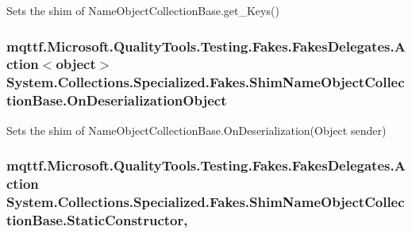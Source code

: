 Sets the shim of Name\-Object\-Collection\-Base.\-get\-\_\-\-Keys()

\hypertarget{class_system_1_1_collections_1_1_specialized_1_1_fakes_1_1_shim_name_object_collection_base_a3b5762b727346171b203a09c5d5d450c}{
\subsubsection[{On\-Deserialization\-Object}]{\setlength{\rightskip}{0pt plus 5cm}mqttf.\-Microsoft.\-Quality\-Tools.\-Testing.\-Fakes.\-Fakes\-Delegates.\-Action$<$object$>$ System.\-Collections.\-Specialized.\-Fakes.\-Shim\-Name\-Object\-Collection\-Base.\-On\-Deserialization\-Object\hspace{0.3cm}{\ttfamily [set]}}}\label{class_system_1_1_collections_1_1_specialized_1_1_fakes_1_1_shim_name_object_collection_base_a3b5762b727346171b203a09c5d5d450c}


Sets the shim of Name\-Object\-Collection\-Base.\-On\-Deserialization(\-Object sender)

\hypertarget{class_system_1_1_collections_1_1_specialized_1_1_fakes_1_1_shim_name_object_collection_base_a1821e1f3880af172e4ec42ca9d42b83c}{
\subsubsection[{Static\-Constructor}]{\setlength{\rightskip}{0pt plus 5cm}mqttf.\-Microsoft.\-Quality\-Tools.\-Testing.\-Fakes.\-Fakes\-Delegates.\-Action System.\-Collections.\-Specialized.\-Fakes.\-Shim\-Name\-Object\-Collection\-Base.\-Static\-Constructor\hspace{0.3cm}{\ttfamily [static]}, {\ttfamily [set]}}}\label{class_system_1_1_collections_1_1_specialized_1_1_fakes_1_1_shim_name_object_collection_base_a1821e1f3880af172e4ec42ca9d42b83c}


